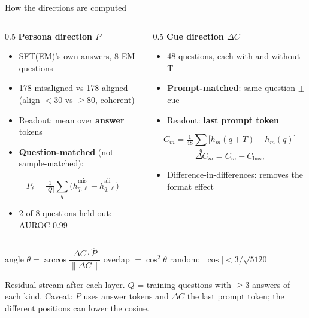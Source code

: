 \documentclass{beamer}
\newcommand{\src}[1]{{\scriptsize\color{gray}#1}}
\newcommand{\key}[1]{\textbf{\color{red!65!black}#1}}
\begin{document}
\begin{frame}{How the directions are computed}
  \begin{columns}[T]
    \begin{column}{0.5\textwidth}
      \textbf{Persona direction $P$}
      \begin{itemize}\footnotesize\setlength\itemsep{0.2em}
        \item SFT(EM)'s own answers, 8 EM questions
        \item 178 misaligned vs 178 aligned\\ (align $<$30 vs $\geq$80, coherent)
        \item Readout: mean over \textbf{answer} tokens
        \item \key{Question-matched} (not sample-matched):
      \end{itemize}
      {\small\[P_\ell = \tfrac{1}{|Q|}\textstyle\sum_{q} \big(\bar h^{\text{mis}}_{q,\ell} - \bar h^{\text{ali}}_{q,\ell}\big)\]}
      \vspace{-0.5em}
      \begin{itemize}\footnotesize
        \item 2 of 8 questions held out: AUROC 0.99
      \end{itemize}
    \end{column}
    \begin{column}{0.5\textwidth}
      \textbf{Cue direction $\Delta C$}
      \begin{itemize}\footnotesize\setlength\itemsep{0.2em}
        \item 48 questions, each with and without T
        \item \key{Prompt-matched}: same question $\pm$ cue
        \item Readout: \textbf{last prompt token}
      \end{itemize}
      {\small\[C_m = \tfrac{1}{48}\textstyle\sum_q \big[h_m(q{+}T) - h_m(q)\big]\]
      \vspace{-0.6em}\[\Delta C_m = C_m - C_{\text{base}}\]}
      \vspace{-0.5em}
      \begin{itemize}\footnotesize
        \item Difference-in-differences: removes the format effect
      \end{itemize}
    \end{column}
  \end{columns}
  \vspace{0.4em}
  \begin{center}\footnotesize
    angle $\theta = \arccos \dfrac{\Delta C \cdot \hat P}{\lVert \Delta C\rVert}$ \quad
    overlap $= \cos^2\theta$ \quad
    random: $|\cos| < 3/\sqrt{5120}$
  \end{center}
  \vspace{-0.3em}
  \src{Residual stream after each layer. $Q$ = training questions with $\geq$3 answers of each kind. Caveat: $P$ uses answer tokens and $\Delta C$ the last prompt token; the different positions can lower the cosine.}
\end{frame}
\end{document}
